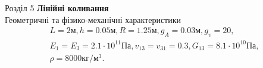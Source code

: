 \documentclass[8pt]{beamer}
\numberwithin{figure}{section}
\numberwithin{equation}{section}
\numberwithin{table}{section}
\begin{document}
\begin{frame}{Розділ 5}
\textbf{Лінійні коливання}
\\
Геометричні та фізико-механічні  характеристики
\begin{equation}
\begin{gathered}
L=2\text{м}, h=0.05\text{м},R=1.25\text{м},g_A=0.03\text{м}, g_v=20,\\
E_1=E_3=2.1\cdot 10^{11} Па, v_{13}=v_{31}=0.3, G_{13}=8.1\cdot 10^{10} Па,\\ \rho=8000 кг/м^3.
\end{gathered}
\end{equation}

\begin{table}[h!]
\caption{Залежність найменшої власної частоти ($\omega$) від частоти гофрування ($g_v$) панелі}
\centering
{}
\end{table}


\end{frame}
\end{document}
